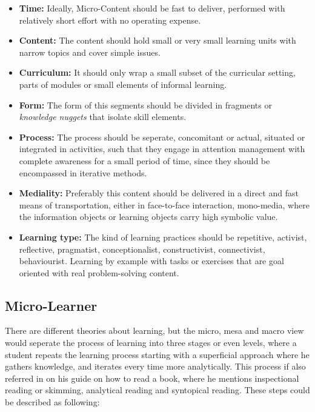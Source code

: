 \begin{itemize}
    \item \textbf{Time:} 
        Ideally, Micro-Content should be fast to deliver, performed with relatively
        short effort with no operating expense.
    \item \textbf{Content:} The content should hold small or very small learning units
        with narrow topics and cover simple issues.
    \item \textbf{Curriculum:} 
        It should only wrap a small subset of the curricular setting, parts of modules
        or small elements of informal learning.
    \item \textbf{Form:} 
        The form of this segments should be divided in fragments or 
        \textit{knowledge nuggets} that isolate skill elements.
    \item \textbf{Process:} The process should be
        seperate, concomitant or actual, situated or integrated in activities, such
        that they engage in attention management with complete awareness for a small
        period of time, since they should be encompassed in iterative methods.
    \item \textbf{Mediality:} 
        Preferably this content should be delivered in a direct and fast means of
        transportation, either in face-to-face interaction, mono-media, where the
        information objects or learning objects carry high symbolic value.
    \item \textbf{Learning type:} 
        The kind of learning practices should be repetitive, activist, 
        reflective, pragmatist, 
        conceptionalist, 
        constructivist, connectivist, behaviourist. Learning by example with tasks
        or exercises that are goal oriented with real problem-solving content.
\end{itemize}


\subsection{Micro-Learner}

There are different theories about learning, but the micro, mesa and macro view 
would seperate the process of learning into three stages or even levels, where a 
student repeats the learning process starting with a superficial approach where 
he gathers knowledge, and iterates every time more analytically. This process 
if also referred in \cite{adler_1970} on his guide on how to read a book, where he
mentions inspectional reading or skimming, analytical reading and syntopical reading.
These steps could be described as following:

